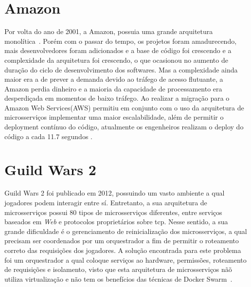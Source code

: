 \section{Amazon}
Por volta do ano de 2001, a Amazon, possuia uma grande arquitetura monolítica~\cite{microservicesAmazon1}. Porém com o passar do tempo, os projetos foram amadurecendo, mais desenvolvedores foram adicionados e a base de código foi crescendo e a complexidade da arquitetura foi crescendo, o que ocasionou no aumento de duração do ciclo de desenvolvimento dos softwares.
Mas a complexidade ainda maior era a de prever a demanda devido ao tráfego de acesso flutuante, a Amazon perdia dinheiro e a maioria da capacidade de processamento era desperdiçada em momentos de baixo tráfego. Ao realizar a migração para o Amazon Web Services(AWS) permitiu em conjunto com o uso da arquitetura de microsserviços implementar uma maior escalabilidade, além de permitir o deployment contínuo do código, atualmente os engenheiros realizam o deploy do código a cada 11.7 segundos \cite{microservicesAmazon2}.

\section{Guild Wars 2}
Guild Wars 2 foi publicado em 2012, possuindo um vasto ambiente a qual jogadores podem interagir entre sí.
%
Entretanto, a sua arquitetura de microsserviços possui 80 tipos de microsserviços diferentes, entre serviços baseados em \textit{Web} e protocolos proprietários sobre \ac{tcp}.
%
Nesse sentido, a sua grande dificuldade é o gerenciamento de reinicialização dos microsserviços, a qual precisam ser coordenados por um orquestrador a fim de permitir o roteamento correto das requisições dos jogadores.
%
A solução encontrada para este problema foi um orquestrador a qual coloque serviços ao hardware, permissões, roteamento de requisições e isolamento, visto que esta arquitetura de microsserviços nãõ utiliza virtualização e não tem os benefícios das técnicas de Docker Swarm~\cite{stephenclarkewillson2017}.
